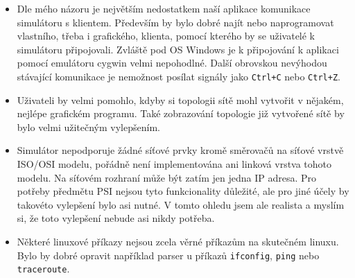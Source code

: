 \begin{itemize}
\item Dle mého názoru je největším nedostatkem naší aplikace komunikace simulátoru s klientem. Především by bylo dobré najít nebo naprogramovat vlastního, třeba i grafického, klienta, pomocí kterého by se uživatelé k simulátoru připojovali. Zvláště pod OS Windows je  k připojování k aplikaci pomocí emulátoru cygwin velmi nepohodlné. Další obrovskou nevýhodou stávající komunikace je nemožnost posílat signály jako \verb|Ctrl+C| nebo \verb|Ctrl+Z|.
\item Uživateli by velmi pomohlo, kdyby si topologii sítě mohl vytvořit v nějakém, nejlépe grafickém programu. Také zobrazování topologie již vytvořené sítě by bylo velmi užitečným vylepšením.
\item Simulátor nepodporuje žádné síťové prvky kromě směrovačů na síťové vrstvě ISO/OSI modelu, pořádně není implementována ani linková vrstva tohoto modelu. Na síťovém rozhraní může být zatím jen jedna IP adresa. Pro potřeby předmětu PSI nejsou tyto funkcionality důležité, ale pro jiné účely by takovéto vylepšení bylo asi nutné. V tomto ohledu jsem ale realista a myslím si, že toto vylepšení nebude asi nikdy potřeba.
\item Některé linuxové příkazy nejsou zcela věrné příkazům na skutečném linuxu. Bylo by dobré opravit například parser u příkazů \verb|ifconfig|, \verb|ping| nebo \verb|traceroute|.
\end{itemize}
